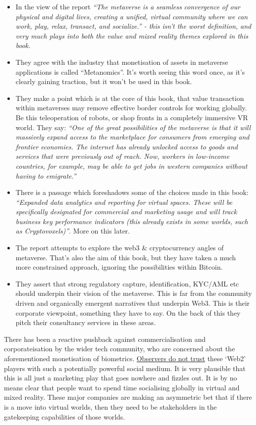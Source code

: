 \begin{itemize}
\item In the view of the report \textit{``The metaverse is a seamless convergence of our physical and digital lives, creating a unified, virtual community where we can work, play, relax, transact, and socialize.'' - this isn't the worst definition, and very much plays into both the value and mixed reality themes explored in this book.}
\item They agree with the industry that monetisation of assets in metaverse applications is called ``Metanomics''. It's worth seeing this word once, as it's clearly gaining traction, but it won't be used in this book.
\item They make a point which is at the core of this book, that value transaction within metaverses may remove effective border controls for working globally. Be this teleoperation of robots, or shop fronts in a completely immersive VR world. They say: \textit{``One of the great possibilities of the metaverse is that it will massively expand access to the marketplace for consumers from emerging and frontier economies. The internet has already unlocked access to goods and services that were previously out of reach. Now, workers in low-income countries, for example, may be able to get jobs in western companies without having to emigrate.''}
\item There is a passage which foreshadows some of the choices made in this book: \textit{``Expanded data analytics and reporting for virtual spaces. These will be specifically designated for commercial and marketing usage and will track business key performance indicators (this
already exists in some worlds, such as Cryptovoxels)''}. More on this later.
\item The report attempts to explore the web3 \& cryptocurrency angles of metaverse. That's also the aim of this book, but they have taken a much more constrained approach, ignoring the possibilities within Bitcoin.
\item They assert that strong regulatory capture, identification, KYC/AML etc should underpin their vision of the metaverse. This is far from the community driven and organically emergent narratives that underpin Web3. This is their corporate viewpoint, something they have to say. On the back of this they pitch their consultancy services in these areas.
\end{itemize}
There has been a reactive pushback against commercialisation and corporateisation by the wider tech community, who are concerned about the aforementioned monetisation of biometrics. \href{https://www.coindesk.com/layer2/2022/01/19/meta-leans-in-to-tracking-your-emotions-in-the-metaverse/}{Observers do not trust} these `Web2' players with such a potentially powerful social medium. It is very plausible that this is all just a marketing play that goes nowhere and fizzles out. It is by no means clear that people want to spend time socialising globally in virtual and mixed reality. These major companies are  making an asymmetric bet that if there is a move into virtual worlds, then they need to be stakeholders in the gatekeeping capabilities of those worlds.
